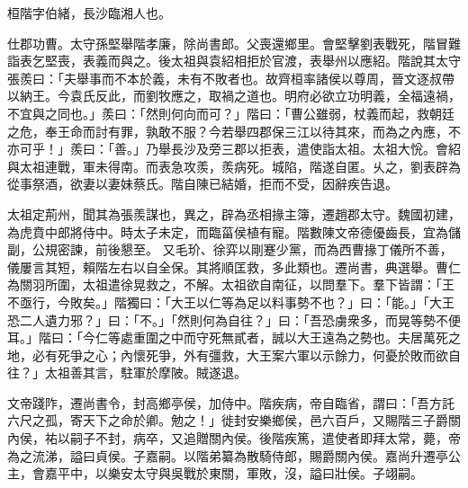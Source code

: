 \begin{pinyinscope}
 
 
 桓階字伯緒，長沙臨湘人也。
 
 
 仕郡功曹。太守孫堅舉階孝廉，除尚書郎。父喪還鄉里。會堅擊劉表戰死，階冒難詣表乞堅喪，表義而與之。後太祖與袁紹相拒於官渡，表舉州以應紹。階說其太守張羨曰：「夫舉事而不本於義，未有不敗者也。故齊桓率諸侯以尊周，晉文逐叔帶以納王。今袁氏反此，而劉牧應之，取禍之道也。明府必欲立功明義，全福遠禍，不宜與之同也。」羨曰：「然則何向而可？」階曰：「曹公雖弱，杖義而起，救朝廷之危，奉王命而討有罪，孰敢不服？今若舉四郡保三江以待其來，而為之內應，不亦可乎！」羨曰：「善。」乃舉長沙及旁三郡以拒表，遣使詣太祖。太祖大恱。會紹與太祖連戰，軍未得南。而表急攻羨，羨病死。城陷，階遂自匿。乆之，劉表辟為從事祭酒，欲妻以妻妹蔡氏。階自陳已結婚，拒而不受，因辭疾告退。
 
 
太祖定荊州，聞其為張羨謀也，異之，辟為丞相掾主簿，遷趙郡太守。魏國初建，為虎賁中郎將侍中。時太子未定，而臨菑侯植有寵。階數陳文帝德優齒長，宜為儲副，公規密諫，前後懇至。
 又毛玠、徐弈以剛蹇少黨，而為西曹掾丁儀所不善，儀屢言其短，賴階左右以自全保。其將順匡救，多此類也。遷尚書，典選舉。曹仁為關羽所圍，太祖遣徐晃救之，不解。太祖欲自南征，以問羣下。羣下皆謂：「王不亟行，今敗矣。」階獨曰：「大王以仁等為足以料事勢不也？」曰：「能。」「大王恐二人遺力邪？」曰：「不。」「然則何為自往？」曰：「吾恐虜衆多，而晃等勢不便耳。」階曰：「今仁等處重圍之中而守死無貳者，誠以大王遠為之勢也。夫居萬死之地，必有死爭之心；內懷死爭，外有彊救，大王案六軍以示餘力，何憂於敗而欲自往？」太祖善其言，駐軍於摩陂。賊遂退。
 
 
文帝踐阼，遷尚書令，封高鄉亭侯，加侍中。階疾病，帝自臨省，謂曰：「吾方託六尺之孤，寄天下之命於卿。勉之！」徙封安樂鄉侯，邑六百戶，又賜階三子爵關內侯，祐以嗣子不封，病卒，又追贈關內侯。後階疾篤，遣使者即拜太常，薨，帝為之流涕，謚曰貞侯。子嘉嗣。以階弟纂為散騎侍郎，賜爵關內侯。嘉尚升遷亭公主，會嘉平中，以樂安太守與吳戰於東關，軍敗，沒，謚曰壯侯。子翊嗣。
 
 
\end{pinyinscope}